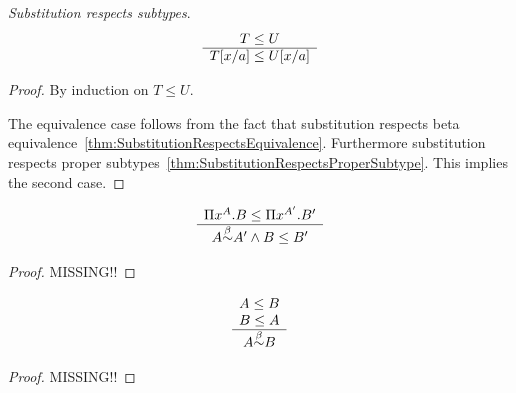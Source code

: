 \begin{theorem}
    \label{thm:SubstitutionRespectsSubtype}
    \emph{Substitution respects subtypes}.
    $$
    \ruleh{
        T \le U
    }
    {
        \sub a x T \le \sub a x U
    }
    $$
    \begin{proof}
        By induction on $T \le U$.

        The equivalence case follows from the fact that substitution respects
        beta equivalence~\ref{thm:SubstitutionRespectsEquivalence}. Furthermore
        substitution respects proper
        subtypes~\ref{thm:SubstitutionRespectsProperSubtype}. This implies the
        second case.
    \end{proof}
\end{theorem}





\begin{theorem}
    \label{thm:ProductSubtype}
    $$
    \ruleh{
        \Pi x^A. B \le \Pi x^{A'}. B'
    }
    {
        A \betaeq A' \land B \le B'
    }
    $$
    \begin{proof}
        MISSING!!
    \end{proof}
\end{theorem}





\begin{theorem}
    \label{thm:SubtypeAntisymmetric}
    $$
    \ruleh{
        A \le B
        \\
        B \le A
    }
    {
        A \betaeq B
    }
    $$
    \begin{proof}
        MISSING!!
    \end{proof}
\end{theorem}
